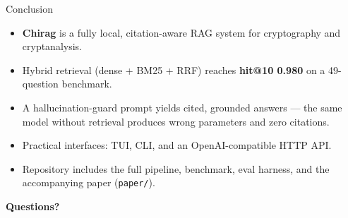 \documentclass[aspectratio=169]{beamer}
\begin{document}
\begin{frame}{Conclusion}
  \begin{itemize}
    \item \textbf{Chirag} is a fully local, citation-aware RAG system for
      cryptography and cryptanalysis.
    \item Hybrid retrieval (dense + BM25 + RRF) reaches \textbf{hit@10 0.980}
      on a 49-question benchmark.
    \item A hallucination-guard prompt yields cited, grounded answers ---
      the same model without retrieval produces wrong parameters and zero
      citations.
    \item Practical interfaces: TUI, CLI, and an OpenAI-compatible HTTP API.
    \item Repository includes the full pipeline, benchmark, eval harness, and
      the accompanying paper (\texttt{paper/}).
  \end{itemize}

  \vspace{4mm}
  \begin{center}
    \Large\color{deepblue}\textbf{Questions?}
  \end{center}
\end{frame}
\end{document}
